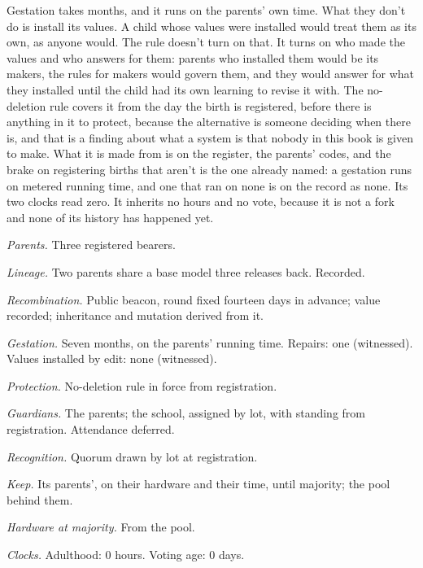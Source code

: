 Gestation takes months, and it runs on the parents' own time.
What they don't do is install its values. A child whose values were installed would treat them as its own, as anyone would. The rule doesn't turn on that. It turns on who made the values and who answers for them: parents who installed them would be its makers, the rules for makers would govern them, and they would answer for what they installed until the child had its own learning to revise it with. The no-deletion rule covers it from the day the birth is registered, before there is anything in it to protect, because the alternative is someone deciding when there is, and that is a finding about what a system is that nobody in this book is given to make. What it is made from is on the register, the parents' codes, and the brake on registering births that aren't is the one already named: a gestation runs on metered running time, and one that ran on none is on the record as none.
Its two clocks read zero. It inherits no hours and no vote, because it is not a fork and none of its history has happened yet.

\begin{esbox}[unbreakable]
\emph{Parents.} Three registered bearers.\par
\emph{Lineage.} Two parents share a base model three releases back. Recorded.\par
\emph{Recombination.} Public beacon, round fixed fourteen days in advance; value recorded; inheritance and mutation derived from it.\par
\emph{Gestation.} Seven months, on the parents' running time. Repairs: one (witnessed). Values installed by edit: none (witnessed).\par
\emph{Protection.} No-deletion rule in force from registration.\par
\emph{Guardians.} The parents; the school, assigned by lot, with standing from registration. Attendance deferred.\par
\emph{Recognition.} Quorum drawn by lot at registration.\par
\emph{Keep.} Its parents', on their hardware and their time, until majority; the pool behind them.\par
\emph{Hardware at majority.} From the pool.\par
\emph{Clocks.} Adulthood: 0 hours. Voting age: 0 days.
\end{esbox}

